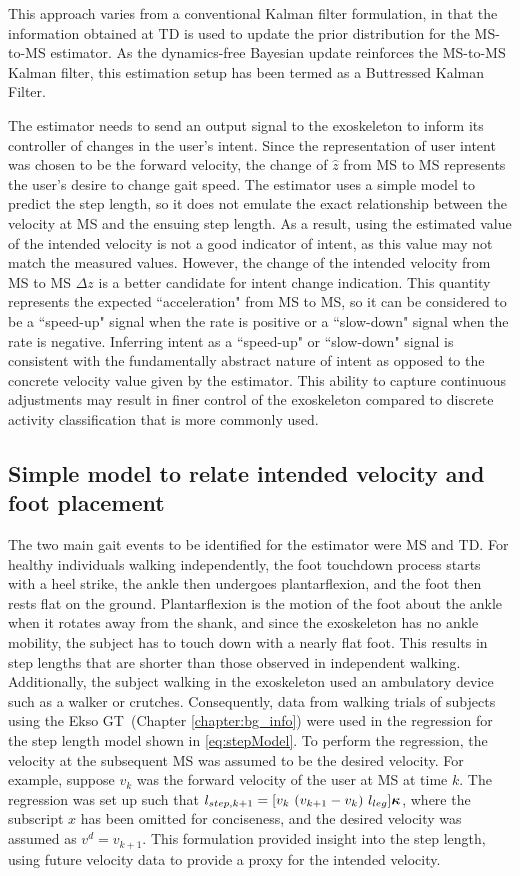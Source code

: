 This approach varies from a conventional Kalman filter formulation, in that the information obtained at TD is used to update the prior distribution for the MS-to-MS estimator. As the dynamics-free Bayesian update reinforces the MS-to-MS Kalman filter, this estimation setup has been termed as a Buttressed Kalman Filter.

The estimator needs to send an output signal to the exoskeleton to inform its controller of changes in the user's intent. Since the representation of user intent was chosen to be the forward velocity, the change of $ \hat{z} $ from MS to MS represents the user's desire to change gait speed. The estimator uses a simple model to predict the step length, so it does not emulate the exact relationship between the velocity at MS and the ensuing step length. As a result, using the estimated value of the intended velocity is not a good indicator of intent, as this value may not match the measured values. However, the change of the intended velocity from MS to MS $ \Delta z $ is a better candidate for intent change indication. This quantity represents the expected ``acceleration" from MS to MS, so it can be considered to be a ``speed-up" signal when the rate is positive or a ``slow-down" signal when the rate is negative. Inferring intent as a ``speed-up" or ``slow-down" signal is consistent with the fundamentally abstract nature of intent as opposed to the concrete velocity value given by the estimator. This ability to capture continuous adjustments may result in finer control of the exoskeleton compared to discrete activity classification that is more commonly used.

\subsection{Simple model to relate intended velocity and foot placement}

The two main gait events to be identified for the estimator were MS and TD. For healthy individuals walking independently, the foot touchdown process starts with a heel strike, the ankle then undergoes plantarflexion, and the foot then rests flat on the ground. Plantarflexion is the motion of the foot about the ankle when it rotates away from the shank, and since the exoskeleton has no ankle mobility, the subject has to touch down with a nearly flat foot. This results in step lengths that are shorter than those observed in independent walking. Additionally, the subject walking in the exoskeleton used an ambulatory device such as a walker or crutches. Consequently, data from walking trials of subjects using the Ekso GT~(Chapter \ref{chapter:bg_info}) were used in the regression for the step length model shown in \eqref{eq:stepModel}. To perform the regression, the velocity at the subsequent MS was assumed to be the desired velocity. For example, suppose $ v_k $ was the forward velocity of the user at MS at time $ k $. The regression was set up such that $ l_{step,{k+1}} = [v_{k}\ (v_{k+1}-v_{k})\ l_{leg}] \boldsymbol{\kappa} $, where the subscript $ x $ has been omitted for conciseness, and the desired velocity was assumed as $ v^d = v_{k+1} $. This formulation provided insight into the step length, using future velocity data to provide a proxy for the intended velocity.

